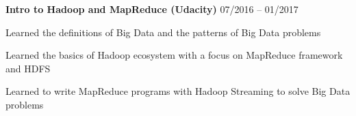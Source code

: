 \documentclass[margin,line]{resume}
\begin{document}
\begin{resume}

    \textbf{Intro to Hadoop and MapReduce (Udacity)} \hfill 07/2016 -- 01/2017 \vspace{-3mm}\\\vspace{-1mm}%
      \begin{list2}
       \item Learned the definitions of Big Data and the patterns of Big Data problems
       \item Learned the basics of Hadoop ecosystem with a focus on MapReduce framework and HDFS
       \item Learned to write MapReduce programs with Hadoop Streaming to solve Big Data problems
      \end{list2}
    \vspace{-2mm}

\end{resume}
\end{document}
